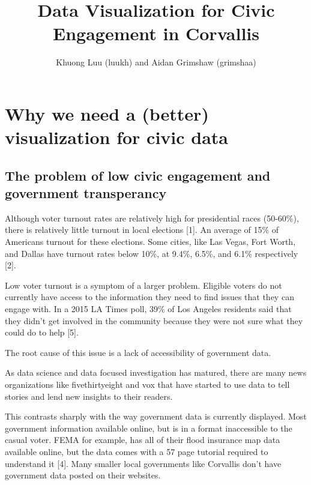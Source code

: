 \documentclass[12pt]{article}
\title{Data Visualization for Civic Engagement in Corvallis}
\author{Khuong Luu (luukh) and Aidan Grimshaw (grimshaa)}
\begin{document}
\maketitle

\tableofcontents

 

 

\section{Why we need a (better) visualization for civic data}

 

\subsection{The problem of low civic engagement and government transperancy}

 

Although voter turnout rates are relatively high for presidential races (50-60\%), there is relatively little turnout in local elections [1]. An average of 15\% of Americans turnout for these elections. Some cities, like Las Vegas, Fort Worth, and Dallas have turnout rates below 10\%, at 9.4\%, 6.5\%, and 6.1\% respectively [2].

 

Low voter turnout is a symptom of a larger problem. Eligible voters do not currently have access to the information they need to find issues that they can engage with. In a 2015 LA Times poll,  39\% of Los Angeles residents said that they didn’t get involved in the community because they were not sure what they could do to help [5].

 

The root cause of this issue is a lack of accessibility of government data.

 

As data science and data focused investigation has matured, there are many news organizations like fivethirtyeight and vox that have started to use data to tell stories and lend new insights to their readers.

 

This contrasts sharply with the way government data is currently displayed. Most government information available online, but is in a format inaccessible to the casual voter. FEMA for example, has all of their flood insurance map data available online, but the data comes with a 57 page tutorial required to understand it [4]. Many smaller local governments like Corvallis don’t have government data posted on their websites.
\end{document}
